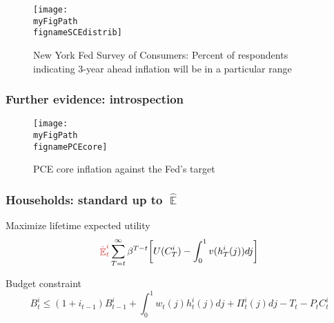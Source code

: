 \documentclass[10pt]{beamer}
\def \myFigPath {../../../figures/}
\DeclareMathOperator{\E}{\mathbb{E}}
\def\fignameSCEdistrib{SCE_distrib_topbottom_command_anchoring_in_data_14_Sep_2020_18_12_59}
\def\fignamePCEcore{PCE_core_target_command_anchoring_in_data_19_Oct_2020_15_24_30}
\begin{document}
\begin{frame}

\begin{figure}[h!]
\caption{New York Fed Survey of Consumers: \newline Percent of respondents indicating 3-year ahead inflation will be in a particular range}
\texttt{[image: \\myFigPath \\fignameSCEdistrib]}
\label{SCEdistrib}
\end{figure}

\vfill 
\hyperlink{rolling}{}	

\end{frame}

\begin{frame}[plain]  %
	\frametitle{Further evidence: introspection}


\begin{figure}[h!]
\caption{PCE core inflation against the Fed's target}
\texttt{[image: \\myFigPath \\fignamePCEcore]}
\label{PCEcore}
\end{figure}

\vfill 
\hyperlink{rolling}{}	

\end{frame}

\begin{frame}[plain]  %
	\frametitle{Households: standard up to $\hat{\E}$}
	\label{HH}

Maximize lifetime expected utility
\begin{equation}
\textcolor{brownreddark}{\hat{\E}^i_t}\sum^{\infty}_{T=t}\beta^{T-t} \bigg[ U(C^i_T) - \int_0^1 v(h^i_T(j)) dj \bigg]
\label{lifetime_U}
\end{equation}	

Budget constraint
\begin{equation}
 B^i_t \leq (1+i_{t-1})B^i_{t-1} + \int_0^1 w_t(j)h^i_t(j) dj + \Pi_t^i(j)  dj-T_t -P_tC^i_t
 \label{BC}
\end{equation}




\vfill 
\hyperlink{model_overview}{}	
\end{frame}
\end{document}
